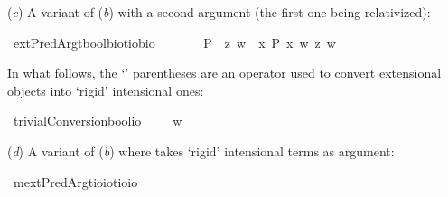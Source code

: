 \begin{isabellebody}
\begin{isamarkuptext}%
(\emph{c}) A variant of (\emph{b}) with a second argument (the first one being relativized):%
\end{isamarkuptext}\isamarkuptrue%
\isamarkupfalse%
\ extPredArg{}{\isacharcolon}{\isacharcolon}{\isachardoublequoteopen}{\isacharparenleft}{\isacharparenleft}{\isacharprime}t{\isasymRightarrow}bool{\isacharparenright}{\isasymRightarrow}{\isacharprime}b{\isasymRightarrow}io{\isacharparenright}{\isasymRightarrow}{\isacharparenleft}{\isacharprime}t{\isasymRightarrow}io{\isacharparenright}{\isasymRightarrow}{\isacharprime}b{\isasymRightarrow}io{\isachardoublequoteclose}\ {\isacharparenleft}\ {\isachardoublequoteopen}{\isasymdown}\ {}{}{\isacharparenright}\isanewline
\ \ \ {\isachardoublequoteopen}{\isasymphi}\ {\isasymdown}P\ {\isasymequiv}\ {\isasymlambda}z{\isachardot}\ {\isasymlambda}w{\isachardot}\ {\isasymphi}\ {\isacharparenleft}{\isasymlambda}x{\isachardot}\ P\ x\ w{\isacharparenright}\ z\ w{\isachardoublequoteclose}%
\begin{isamarkuptext}%
In what follows, the `\isa{{\isasymlparr}{\isacharunderscore}{\isasymrparr}}' parentheses are an operator used to convert extensional objects into `rigid' intensional ones:%
\end{isamarkuptext}\isamarkuptrue%
\isamarkupfalse%
\ trivialConversion{\isacharcolon}{\isacharcolon}{\isachardoublequoteopen}bool{\isasymRightarrow}io{\isachardoublequoteclose}\ {\isacharparenleft}{\isachardoublequoteopen}{\isasymlparr}{\isacharunderscore}{\isasymrparr}{\isachardoublequoteclose}{\isacharparenright}\ \ {\isachardoublequoteopen}{\isasymlparr}{\isasymphi}{\isasymrparr}\ {\isasymequiv}\ {\isacharparenleft}{\isasymlambda}w{\isachardot}\ {\isasymphi}{\isacharparenright}{\isachardoublequoteclose}%
\begin{isamarkuptext}%
(\emph{d}) A variant of (\emph{b}) where \isa{{\isasymphi}} takes `rigid' intensional terms as argument:%
\end{isamarkuptext}\isamarkuptrue%
\isamarkupfalse%
\ mextPredArg{\isacharcolon}{\isacharcolon}{\isachardoublequoteopen}{\isacharparenleft}{\isacharparenleft}{\isacharprime}t{\isasymRightarrow}io{\isacharparenright}{\isasymRightarrow}io{\isacharparenright}{\isasymRightarrow}{\isacharparenleft}{\isacharprime}t{\isasymRightarrow}io{\isacharparenright}{\isasymRightarrow}io{\isachardoublequoteclose}\ {\isacharparenleft}\ {\isachardoublequoteopen}\isactrlbold {\isasymdown}{\isachardoublequoteclose}\ {}{}{\isacharparenright}\isanewline

\end{isabellebody}
